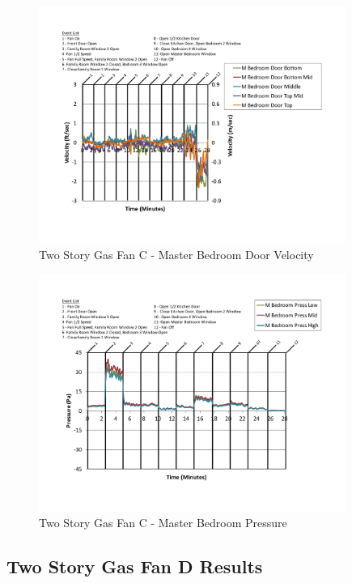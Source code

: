 \documentclass{article}
\begin{document}
\begin{appendices}
	\begin{figure}[H]
		\centering
		\includegraphics[height=3.05in,trim=0.67in 1.1in 0.67in 0.8in,clip=true]{0_Images/Results_Charts/ColdFlow/Two_Story/Gas/C/Master_Bedroom_Door_Velocity.pdf}
		\caption{Two Story Gas Fan C - Master Bedroom Door Velocity}
	\end{figure}
 

	\begin{figure}[H]
		\centering
		\includegraphics[height=3.05in,trim=0.67in 1.1in 0.67in 0.8in,clip=true]{0_Images/Results_Charts/ColdFlow/Two_Story/Gas/C/Master_Bedroom_Pressure.pdf}
		\caption{Two Story Gas Fan C - Master Bedroom Pressure}
	\end{figure}
 
	\clearpage

		\clearpage
\clearpage		\large
\subsection{Two Story Gas Fan D Results} \label{App:Two_StoryGasFanDResults} 


\end{appendices}
\end{document}
